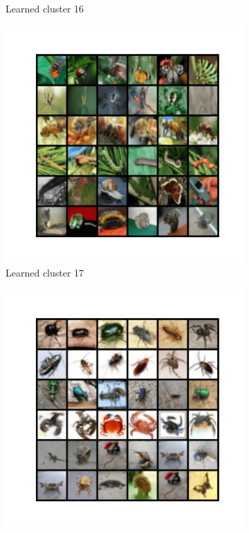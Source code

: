 \documentclass[10pt,twocolumn,letterpaper]{article}
\begin{document}
\begin{figure}
\begin{subfigure}{0.32\textwidth}
       \caption{Learned cluster 16}
     \end{subfigure}
     \hfill
     \begin{subfigure}{0.32\textwidth}
       \includegraphics[width=\linewidth,trim={1cm 2cm 1cm 2cm},clip]{figures/experiments/cifar100_cluster/nearest_class16.png}
       \caption{Learned cluster 17}
     \end{subfigure}
     \hfill
     \begin{subfigure}{0.32\textwidth}
       \includegraphics[width=\linewidth,trim={1cm 2cm 1cm 2cm},clip]{figures/experiments/cifar100_cluster/nearest_class17.png}

\end{subfigure}
\end{figure}
\end{document}
